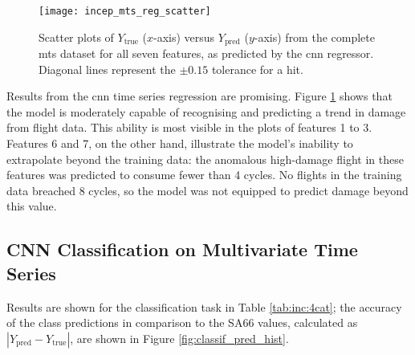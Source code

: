 \begin{figure}[tb!]
    \centering
    \texttt{[image: incep\_mts\_reg\_scatter]}
    \caption{\label{fig:incep_mts_reg_scatter} Scatter plots of \(Y_\text{true}\) (\(x\)-axis) versus \(Y_\text{pred}\) (\(y\)-axis) from the complete \ac{mts} dataset for all seven features, as predicted by the \ac{cnn} regressor. Diagonal lines represent the \(\pm0.15\) tolerance for a hit.}
\end{figure}

Results from the \ac{cnn} time series regression are promising. Figure \ref{fig:incep_mts_reg_scatter} shows that the model is moderately capable of recognising and predicting a trend in damage from flight data. This ability is most visible in the plots of features 1 to 3. Features 6 and 7, on the other hand, illustrate the model's inability to extrapolate beyond the training data: the anomalous high-damage flight in these features was predicted to consume fewer than 4 cycles. No flights in the training data breached 8 cycles, so the model was not equipped to predict damage beyond this value.

\subsection{CNN Classification on Multivariate Time Series} \label{sec:res:cnn:cls}
Results are shown for the classification task in Table \ref{tab:inc:4cat}; the accuracy of the class predictions in comparison to the SA66 values, calculated as \(\left|Y_\text{pred} - Y_\text{true}\right|\), are shown in Figure \ref{fig:classif_pred_hist}.


